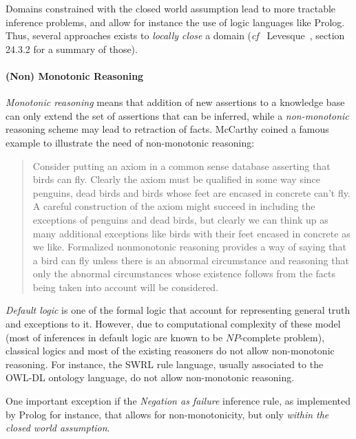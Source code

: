 \documentclass[a4paper, twocolumn]{article}
\newcommand{\cf}{{\textit{cf~}}}
\begin{document}
Domains constrained with the closed world assumption lead to more tractable
inference problems, and allow for instance the use of logic languages like
Prolog. Thus, several approaches exists to \emph{locally close} a domain (\cf
Levesque~\cite{Levesque2008}, section 24.3.2 for a summary of those).

\paragraph{(Non) Monotonic Reasoning}

\emph{Monotonic reasoning} means that addition of new assertions to a knowledge base
can only extend the set of assertions that can be inferred, while a
\emph{non-monotonic} reasoning scheme may lead to retraction of facts.
McCarthy coined a famous example to illustrate the need of non-monotonic reasoning:

\begin{quotation}
Consider putting an axiom in a common sense database asserting that birds can
fly. Clearly the axiom must be qualified in some way since penguins, dead birds
and birds whose feet are encased in concrete can't fly. A careful construction
of the axiom might succeed in including the exceptions of penguins and dead
birds, but clearly we can think up as many additional exceptions like birds
with their feet encased in concrete as we like. Formalized nonmonotonic
reasoning provides a way of saying that a bird can fly unless there
is an abnormal circumstance and reasoning that only the abnormal circumstances
whose existence follows from the facts being taken into account will be
considered.
\end{quotation}

\emph{Default logic} is one of the formal logic that account for representing
general truth and exceptions to it. However, due to computational complexity of
these model (most of inferences in default logic are known to be $NP$-complete
problem), classical logics and most of the existing reasoners do not allow
non-monotonic reasoning. For instance, the SWRL rule language, usually
associated to the OWL-DL ontology language, do not allow non-monotonic
reasoning.


One important exception if the \emph{Negation as failure} inference rule, as
implemented by {\sc Prolog} for instance, that allows for non-monotonicity, but
only \emph{within the closed world assumption}.
\end{document}
